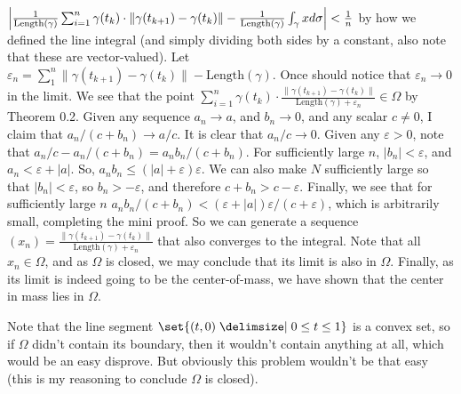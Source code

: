 \documentclass[12pt]{article}
\theoremstyle{definition}
\theoremstyle{remark}
\newcommand{\mg}[1]{\| #1 \|}
\newcommand{\ve}{\varepsilon}
\begin{document}
\begin{enumerate}[leftmargin=\labelsep]
	 $\qty|\frac1{\mathrm{Length}(\gamma)}\sum_{i=1}^{n} \gamma(t_k) \cdot \mg{\gamma(t_{k+1})-\gamma(t_k)} - \frac1{\mathrm{Length}(\gamma)}\int_\gamma xd\sigma| < \frac 1n$ by how we defined the line integral (and simply dividing both sides by a constant, also note that these are vector-valued). Let $\ve_n = \sum_1^n \mg{\gamma(t_{k+1})-\gamma(t_k)} - \mathrm{Length}(\gamma)$. Once should notice that $\ve_n \to 0$ in the limit. We see that the point $\sum_{i=1}^{n} \gamma(t_k) \cdot \frac{\mg{\gamma(t_{k+1})-\gamma(t_k)}}{\mathrm{Length}(\gamma)+\ve_n} \in \Omega$ by Theorem 0.2. Given any sequence $a_n \to a$, and $b_n \to 0$, and any scalar $c \neq 0$, I claim that $a_n/(c+b_n) \to a/c$. It is clear that $a_n/c \to 0$. Given any $\ve > 0$, note that $a_n/c - a_n/(c+b_n) = a_nb_n / (c+b_n)$. For sufficiently large $n$, $|b_n| < \ve$, and $a_n < \ve+|a|$. So, $a_nb_n \leq (|a|+\ve)\ve$. We can also make $N$ sufficiently large so that $|b_n| < \ve$, so $b_n > -\ve$, and therefore $c+b_n > c-\ve$. Finally, we see that for sufficiently large $n$ $a_nb_n/(c+b_n) < (\ve+|a|)\ve/(c+\ve)$, which is arbitrarily small, completing the mini proof. So we can generate a sequence $(x_n) = \frac{\mg{\gamma(t_{k+1})-\gamma(t_k)}}{\mathrm{Length}(\gamma)+\ve_n}$ that also converges to the integral. Note that all $x_n \in \Omega$, and as $\Omega$ is closed, we may conclude that its limit is also in $\Omega$. Finally, as its limit is indeed going to be the center-of-mass, we have shown that the center in mass lies in $\Omega$. 
	 
	 Note that the line segment $\set{(t, 0) \given 0 \leq t \leq 1}$ is a convex set, so if $\Omega$ didn't contain its boundary, then it wouldn't contain anything at all, which would be an easy disprove. But obviously this problem wouldn't be that easy (this is my reasoning to conclude $\Omega$ is closed).
	\end{enumerate}
\end{document}
